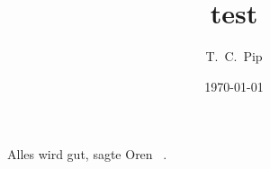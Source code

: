 ﻿\documentclass[12pt]{scrartcl}
\begin{document}
\title{test}
\author{T.\ C.\ Pip}
\date{\today}
\maketitle

Alles wird gut, sagte Oren~ \cite{bibtex}.

\newpage
{}

\end{document}
